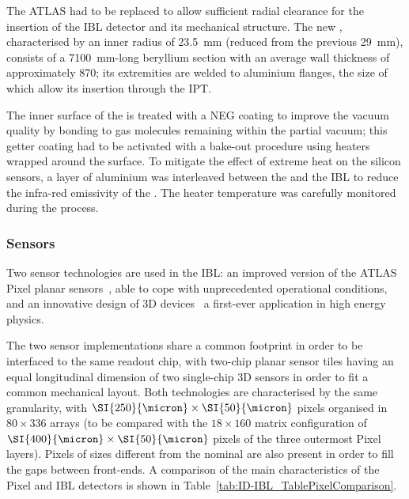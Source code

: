 \documentclass[cernpreprint, atlasdraft=false, UKenglish,british,orcidlogo, texmf, orcidlogo]{atlasdoc}
\begin{document}
The ATLAS \beampipe had to be replaced to allow sufficient radial clearance for the insertion of the \gls{IBL} detector and its mechanical structure. The new \beampipe, characterised by an inner radius of \SI{23.5}{\mm} (reduced from the previous \SI{29}{\mm}), consists of a \SI{7100}{\mm}-long beryllium section with an average wall thickness of approximately \SI{870}{\micron}; its extremities are welded to aluminium flanges, the size of which allow its insertion through the \gls{IPT}.
 
The inner surface of the \beampipe is treated with a \gls{NEG} coating to improve the vacuum quality by bonding to gas molecules remaining within the partial vacuum;
this getter coating had to be activated with a bake-out procedure using heaters wrapped around the \beampipe surface. To mitigate the effect of extreme heat on the silicon sensors, a layer of aluminium was interleaved between the \beampipe and the \gls{IBL} to reduce the infra-red emissivity of the \beampipe. The heater temperature was carefully monitored during the process.
 
\subsubsection{Sensors}
\label{sec:ID-IBL-Sensors}
 
Two sensor technologies are used in the \gls{IBL}: an improved version of the ATLAS \RunOne Pixel planar sensors~\cite{Pixel}, able to
cope with unprecedented operational conditions, and an innovative design of 3D devices~\cite{3D} a first-ever application in high energy physics.
 
The two sensor implementations share a common footprint in order to be interfaced to the same readout chip, with two-chip planar sensor tiles having an equal longitudinal dimension of two single-chip 3D sensors in order to fit a common mechanical layout. Both technologies are characterised by the same granularity, with $\SI{250}{\micron}\times\SI{50}{\micron}$
pixels organised in $80 \times 336$ arrays (to be compared with the $18 \times 160$ matrix configuration of $\SI{400}{\micron}\times\SI{50}{\micron}$ pixels of the three outermost Pixel layers). Pixels of sizes different from the nominal are also present in order to fill the gaps between front-ends. A comparison of the main characteristics of the Pixel and \gls{IBL} detectors is shown in Table~\ref{tab:ID-IBL_TablePixelComparison}.
 
\end{document}
